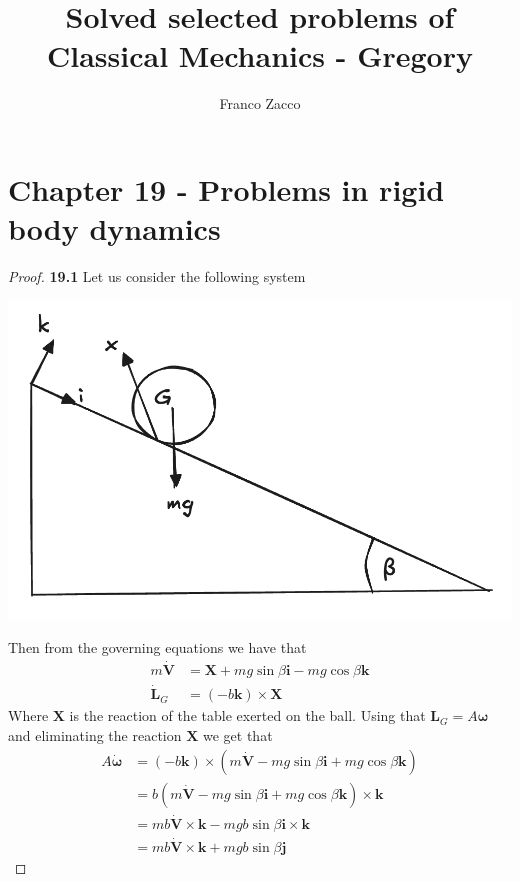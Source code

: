 \documentclass[11pt]{article}
\title{\textbf{Solved selected problems of Classical Mechanics - Gregory}}
\author{Franco Zacco}
\date{}
\theoremstyle{definition}
\begin{document}
\maketitle
\thispagestyle{empty}

\section*{Chapter 19 - Problems in rigid body dynamics}

\begin{proof}{\textbf{19.1}}
    Let us consider the following system
    \begin{center}
        \includegraphics[scale=0.3]{ch19-1.png}
    \end{center}
    Then from the governing equations we have that
    \begin{align*}
        m\bm{\dot{V}} &= \bm{X} + mg\sin\beta\bm{i} - mg\cos\beta\bm{k}\\
        \bm{\dot{L}}_G &= (-b\bm{k}) \times \bm{X} 
    \end{align*}
    Where $\bm{X}$ is the reaction of the table exerted on the ball.
    Using that $\bm{L}_G = A\bm{\omega}$ and eliminating the reaction $\bm{X}$
    we get that
    \begin{align*}
        A\bm{\dot{\omega}}
        &= (-b\bm{k})
        \times (m\bm{\dot{V}} - mg\sin\beta\bm{i} + mg\cos\beta\bm{k})\\
        &= b(m\bm{\dot{V}} - mg\sin\beta\bm{i} + mg\cos\beta\bm{k})
        \times \bm{k}\\
        &= mb\bm{\dot{V}}\times\bm{k} - mgb\sin\beta\bm{i}\times \bm{k}\\
        &= mb\bm{\dot{V}}\times\bm{k} + mgb\sin\beta\bm{j}
    \end{align*}

\end{proof}
\end{document}
